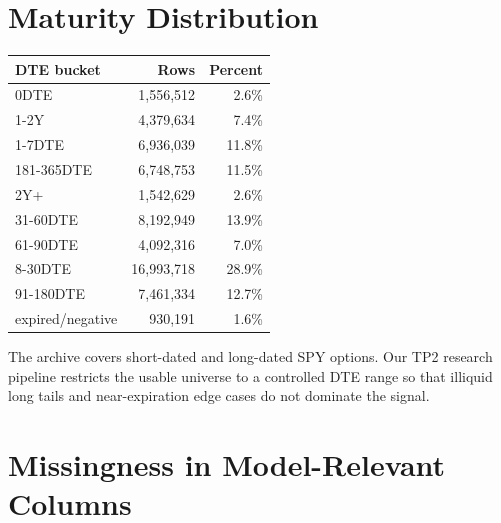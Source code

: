 \documentclass[11pt]{article}
\begin{document}
\section*{Maturity Distribution}

\begin{center}
\begin{tabular}{lrr}
\toprule
DTE bucket & Rows & Percent \\
\midrule
0DTE & 1,556,512 & 2.6\% \\
1-2Y & 4,379,634 & 7.4\% \\
1-7DTE & 6,936,039 & 11.8\% \\
181-365DTE & 6,748,753 & 11.5\% \\
2Y+ & 1,542,629 & 2.6\% \\
31-60DTE & 8,192,949 & 13.9\% \\
61-90DTE & 4,092,316 & 7.0\% \\
8-30DTE & 16,993,718 & 28.9\% \\
91-180DTE & 7,461,334 & 12.7\% \\
expired/negative & 930,191 & 1.6\% \\
\bottomrule
\end{tabular}
\end{center}

The archive covers short-dated and long-dated SPY options. Our TP2 research
pipeline restricts the usable universe to a controlled DTE range so that
illiquid long tails and near-expiration edge cases do not dominate the signal.

\section*{Missingness in Model-Relevant Columns}
\end{document}
